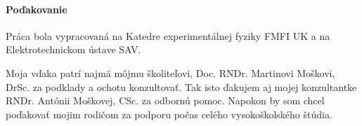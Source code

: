 
\vfill
\thispagestyle{empty}
\paragraph{Poďakovanie}

Práca bola vypracovaná na Katedre experimentálnej fyziky FMFI UK a na Elektrotechnickom ústave SAV.

Moja vďaka patrí najmä môjmu školiteľovi, Doc. RNDr. Martinovi Moškovi, DrSc. za podklady a ochotu konzultovať.
Tak isto ďakujem aj mojej konzultantke RNDr. Antónii Moškovej, CSc. za odbornú pomoc. Napokon by som chcel poďakovať mojim rodičom
za podporu počas celého vysokoškolského štúdia.
